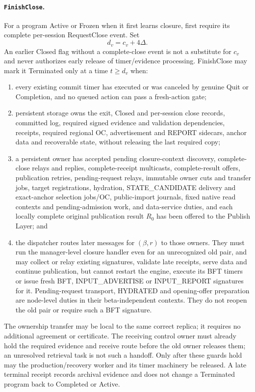 \paragraph{\texttt{FinishClose}.}
For a program Active or Frozen when it first learns closure, first
require its complete per-session RequestClose event. Set
\[
 d_v=c_v+4\Delta.
\]
An earlier Closed flag without a complete-close event is not a substitute
for $c_v$ and never authorizes early release of timer/evidence processing.
FinishClose may mark it Terminated only at a time $t\ge d_v$ when:
\begin{enumerate}[label=(\roman*),itemsep=2pt]
\item every existing commit timer has executed or was canceled by
genuine Quit or Completion, and no queued action can pass a fresh-action
gate;
\item persistent storage owns the exit, Closed and per-session close records,
committed log, required signed evidence and validation dependencies,
receipts, required regional OC, advertisement and REPORT sidecars, anchor data and recoverable
state, without releasing the last
required copy;
\item a persistent owner has accepted pending closure-context discovery,
complete-close relays and replies, complete-receipt multicasts,
complete-result offers, publication retries, pending-request relays,
immutable owner cuts and transfer jobs, target registrations, hydration,
STATE\_CANDIDATE delivery and exact-anchor selection jobs/OC,
public-import journals, fixed native read contexts and pending-admission
work, and data-service duties, and each locally complete original publication
result $R_0$ has been offered to the
Publish Layer; and
\item the dispatcher routes later messages for $(\beta,r)$ to those
owners. They must run the manager-level closure handler even for an
unrecognized old pair, and may collect or relay existing signatures,
validate late receipts, serve data and continue publication, but cannot restart the
engine, execute its BFT timers or issue fresh BFT, INPUT\_ADVERTISE or INPUT\_REPORT
signatures for it. Pending-request transport, HYDRATED and opening-offer
preparation are node-level duties in their beta-independent contexts.
They do not reopen the old pair or require such a BFT signature.
\end{enumerate}
The ownership transfer may be local to the same correct replica; it
requires no additional agreement or certificate. The receiving control
owner must already hold the required evidence and receive route before
the old owner releases them; an unresolved retrieval task is not such
a handoff. Only after these
guards hold may the production/recovery worker and its timer machinery
be released. A late terminal receipt records archival evidence and does
not change a Terminated program back to Completed or Active.

